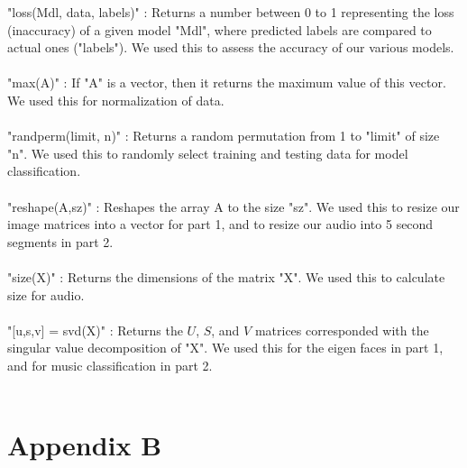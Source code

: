 \documentclass{article}
\begin{document}
"loss(Mdl, data, labels)" : Returns a number between 0 to 1 representing the loss (inaccuracy) of a given model "Mdl", where predicted labels are compared to actual ones ("labels"). We used this to assess the accuracy of our various models. \\ \\
"max(A)" : If "A" is a vector, then it returns the maximum value of this vector. We used this for normalization of data. \\ \\
"randperm(limit, n)" : Returns a random permutation from 1 to "limit" of size "n". We used this to randomly select training and testing data for model classification. \\ \\
"reshape(A,sz)" : Reshapes the array A to the size "sz". We used this to resize our image matrices into a vector for part 1, and to resize our audio into 5 second segments in part 2. \\ \\
"size(X)" : Returns the dimensions of the matrix "X". We used this to calculate size for audio. \\ \\
"[u,s,v] = svd(X)" : Returns the $U$, $S$, and $V$ matrices corresponded with the singular value decomposition of "X". We used this for the eigen faces in part 1, and for music classification in part 2. \\ \\

\section*{\fontsize{19}{15}\selectfont Appendix B}
\end{document}
